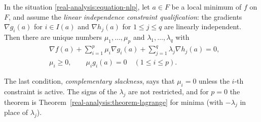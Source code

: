 \begin{theorem}\label{real-analysis:theorem-kkt}
In the situation \eqref{real-analysis:equation-nlp}, let $a \in F$ be a local minimum of $f$ on $F$, and assume the \emph{linear independence constraint qualification}: the gradients $\nabla g_i(a)$ for
$i \in I(a)$ and $\nabla h_j(a)$ for $1 \leq j \leq q$ are linearly independent. Then there are unique numbers $\mu_1, \ldots, \mu_p$ and $\lambda_1, \ldots, \lambda_q$ with
\begin{equation}\label{real-analysis:equation-kkt}
\begin{aligned}
&\nabla f(a) + \sum_{i=1}^p\mu_i\nabla g_i(a) + \sum_{j=1}^q\lambda_j\nabla h_j(a) = 0,\\
&\mu_i \geq 0, \qquad \mu_ig_i(a) = 0 \quad (1 \leq i \leq p).
\end{aligned}
\end{equation}
\end{theorem}

The last condition, \emph{complementary slackness}, says that $\mu_i = 0$ unless the $i$-th constraint is active. The signs of the $\lambda_j$ are not restricted, and for $p = 0$ the theorem is
Theorem~\ref{real-analysis:theorem-lagrange} for minima (with $-\lambda_j$ in place of $\lambda_j$).

